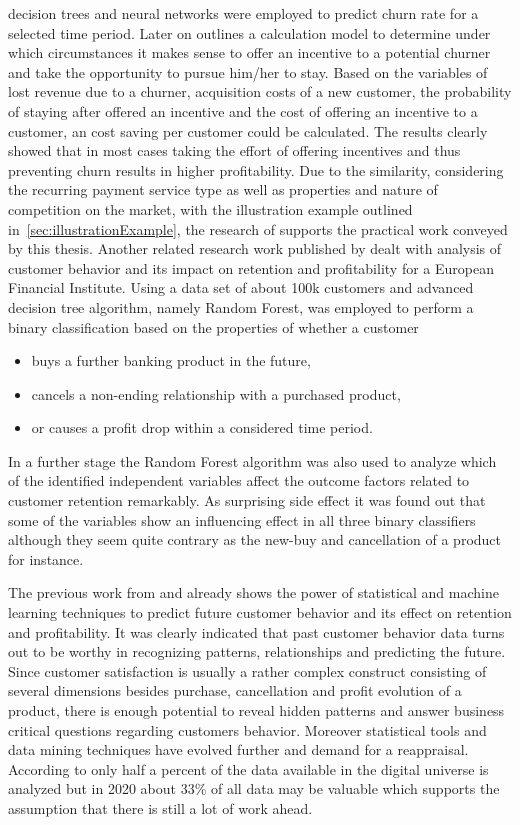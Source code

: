 decision trees and neural networks were employed to predict churn rate for a selected time period. Later on \cite{mozer2000predicting} outlines a calculation model to determine under which circumstances it makes sense to offer an incentive to a potential churner and take the opportunity to pursue him/her to stay. Based on the variables of lost revenue due to a churner, acquisition costs of a new customer, the probability of staying after offered an incentive and the cost of offering an incentive to a customer, an cost saving per customer could be calculated. The results clearly showed that in most cases taking the effort of offering incentives and thus preventing churn results in higher profitability. Due to the similarity, considering the recurring payment service type as well as properties and nature of competition on the market, with the illustration example outlined in~\ref{sec:illustrationExample}, the research of \cite{mozer2000predicting} supports the practical work conveyed by this thesis. Another related research work published by \cite{lariviere2005predicting} dealt with analysis of customer behavior and its impact on retention and profitability for a European Financial Institute. Using a data set of about 100k customers and advanced decision tree algorithm, namely Random Forest, was employed to perform a binary classification based on the properties of whether a customer
\begin{itemize}
	\item buys a further banking product in the future,
	\item cancels a non-ending relationship with a purchased product,
	\item or causes a profit drop within a considered time period.
\end{itemize}
In a further stage the Random Forest algorithm was also used to analyze which of the identified independent variables affect the outcome factors related to customer retention remarkably. As surprising side effect it was found out that some of the variables show an influencing effect in all three binary classifiers although they seem quite contrary as the new-buy and cancellation of a product for instance. 

The previous work from \cite{mozer2000predicting} and \cite{lariviere2005predicting} already shows the power of statistical and machine learning techniques to predict future customer behavior and its effect on retention and profitability. It was clearly indicated that past customer behavior data turns out to be worthy in recognizing patterns, relationships and predicting the future. Since customer satisfaction is usually a rather complex construct consisting of several dimensions besides purchase, cancellation and profit evolution of a product, there is enough potential to reveal hidden patterns and answer business critical questions regarding customers behavior. Moreover statistical tools and data mining techniques have evolved further and demand for a reappraisal. According to \cite{gantz2012digital} only half a percent of the data available in the digital universe is analyzed but in 2020 about 33\% of all data may be valuable which supports the assumption that there is still a lot of work ahead. 

